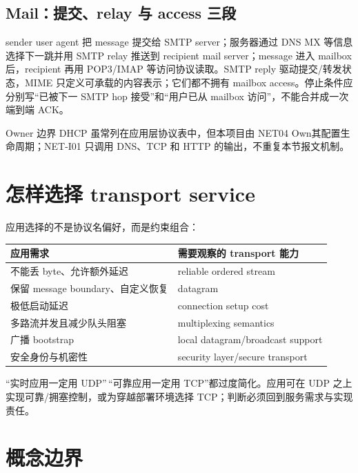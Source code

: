 \documentclass[UTF8,fontset=none,11pt,a4paper]{ctexart}
\begin{document}
\subsection{Mail：提交、relay 与 access 三段}

sender user agent 把 message 提交给 SMTP server；服务器通过 DNS MX 等信息选择下一跳并用 SMTP relay 推送到 recipient mail server；message 进入 mailbox 后，recipient 再用 POP3/IMAP 等访问协议读取。SMTP reply 驱动提交/转发状态，MIME 只定义可承载的内容表示；它们都不拥有 mailbox access。停止条件应分别写“已被下一 SMTP hop 接受”和“用户已从 mailbox 访问”，不能合并成一次端到端 ACK。

\begin{warnbox}{Owner 边界}
DHCP 虽常列在应用层协议表中，但本项目由 NET04 Own其配置生命周期；NET-I01 只调用 DNS、TCP 和 HTTP 的输出，不重复本节报文机制。
\end{warnbox}

\section{怎样选择 transport
service}\label{8-ux600eux6837ux9009ux62e9-transport-service}

应用选择的不是协议名偏好，而是约束组合：

\begin{longtable}[]{@{}ll@{}}
\toprule\noalign{}
应用需求 & 需要观察的 transport 能力 \\
\midrule\noalign{}
\endhead
\bottomrule\noalign{}
\endlastfoot
不能丢 byte、允许额外延迟 & reliable ordered stream \\
保留 message boundary、自定义恢复 & datagram \\
极低启动延迟 & connection setup cost \\
多路流并发且减少队头阻塞 & multiplexing semantics \\
广播 bootstrap & local datagram/broadcast support \\
安全身份与机密性 & security layer/secure transport \\
\end{longtable}

``实时应用一定用 UDP''\,``可靠应用一定用 TCP''都过度简化。应用可在 UDP
之上实现可靠/拥塞控制，或为穿越部署环境选择
TCP；判断必须回到服务需求与实现责任。

\section{概念边界}\label{9-ux6982ux5ff5ux8fb9ux754c}
\end{document}
